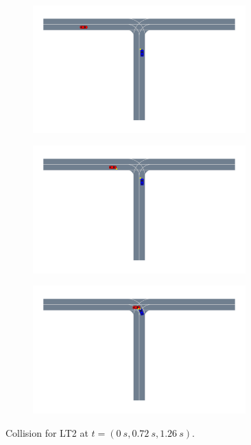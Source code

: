 \begin{figure}
    \centering
    \begin{subfigure}[t]{0.33\columnwidth}
        \centering
        \includegraphics[width=0.9\textwidth, trim={10cm 16.5cm 22cm 0},clip]{figures/interpretable_validation/2car_res2_frame_01.pdf}
    \end{subfigure}%
   \begin{subfigure}[t]{0.33\columnwidth}
        \centering
        \includegraphics[width=0.9\textwidth, trim={10cm 16.5cm 22cm 0},clip]{figures/interpretable_validation/2car_res2_frame_05.pdf}
    \end{subfigure}%
    \begin{subfigure}[t]{0.33\columnwidth}
        \centering
        \includegraphics[width=0.9\textwidth, trim={10cm 16.5cm 22cm 0},clip]{figures/interpretable_validation/2car_res2_frame_08.pdf}
    \end{subfigure}
    \caption{Collision for LT2 at $t=(\SI{0}{s}, \SI{0.72}{s}, \SI{1.26}{s})$.}
    \label{fig:2car_LT2}
\end{figure}


